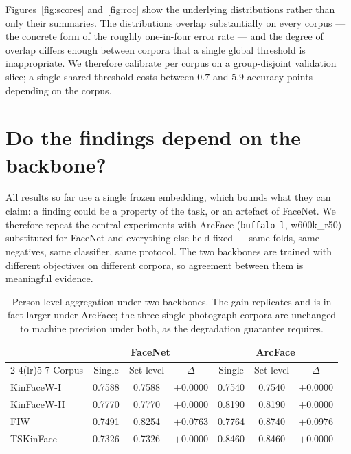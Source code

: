 \documentclass[preprint,12pt]{elsarticle}
\begin{document}
Figures~\ref{fig:scores} and~\ref{fig:roc} show the underlying distributions
rather than only their summaries. The distributions overlap substantially on
every corpus --- the concrete form of the roughly one-in-four error rate --- and
the degree of overlap differs enough between corpora that a single global
threshold is inappropriate. We therefore calibrate per corpus on a
group-disjoint validation slice; a single shared threshold costs between $0.7$
and $5.9$ accuracy points depending on the corpus.

\section{Do the findings depend on the backbone?}
\label{sec:backbone}

All results so far use a single frozen embedding, which bounds what they can
claim: a finding could be a property of the task, or an artefact of FaceNet. We
therefore repeat the central experiments with ArcFace (\texttt{buffalo\_l},
w600k\_r50) substituted for FaceNet and everything else held fixed --- same
folds, same negatives, same classifier, same protocol. The two backbones are
trained with different objectives on different corpora, so agreement between
them is meaningful evidence.

\begin{table}[t]
\centering
\caption{Person-level aggregation under two backbones. The gain replicates and
is in fact larger under ArcFace; the three single-photograph corpora are
unchanged to machine precision under both, as the degradation guarantee
requires.}
\label{tab:backbone}
\begin{tabular}{lcccccc}
\toprule
& \multicolumn{3}{c}{FaceNet} & \multicolumn{3}{c}{ArcFace} \\
\cmidrule(lr){2-4}\cmidrule(lr){5-7}
Corpus & Single & Set-level & $\Delta$ & Single & Set-level & $\Delta$ \\
\midrule
KinFaceW-I & 0.7588 & 0.7588 & $+0.0000$ & 0.7540 & 0.7540 & $+0.0000$ \\
KinFaceW-II & 0.7770 & 0.7770 & $+0.0000$ & 0.8190 & 0.8190 & $+0.0000$ \\
FIW & 0.7491 & 0.8254 & $+0.0763$ & 0.7764 & 0.8740 & $+0.0976$ \\
TSKinFace & 0.7326 & 0.7326 & $+0.0000$ & 0.8460 & 0.8460 & $+0.0000$ \\
\bottomrule
\end{tabular}
\end{table}
\end{document}
